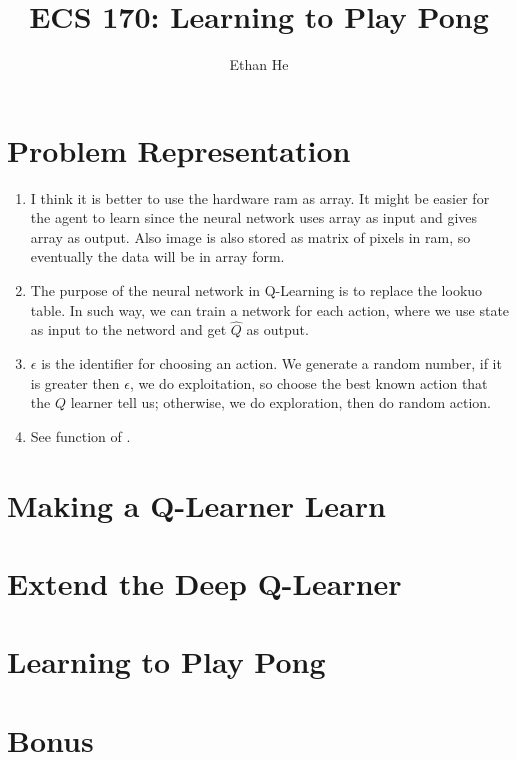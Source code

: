 \documentclass[12pt]{article}
\title{ECS 170: Learning to Play Pong}
\author{Ethan He}
\date{\vspace{-1cm}}
\newcommand{\1}{\mathds{1}}
\newcommand{\<}{\langle}
\renewcommand{\>}{\rangle}
\begin{document}
\maketitle

\section{Problem Representation}

\begin{enumerate}
    \item I think it is better to use the hardware ram as array.
        It might be easier for the agent to learn since the neural network
        uses array as input and gives array as output.
        Also image is also stored as matrix of pixels in ram,
        so eventually the data will be in array form.

    \item The purpose of the neural network in Q-Learning is to replace the lookuo table.
        In such way, we can train a network for each action,
        where we use state as input to the netword and get $\widehat{Q}$ as output.

    \item $\epsilon$ is the identifier for choosing an action.
        We generate a random number,
        if it is greater then $\epsilon$,
        we do exploitation, so choose the best known action that the $Q$ learner tell us;
        otherwise, we do exploration, then do random action.

    \item See function  of .
\end{enumerate}



\section{Making a Q-Learner Learn}


\section{Extend the Deep Q-Learner}



\section{Learning to Play Pong}



\section{Bonus}
\end{document}
